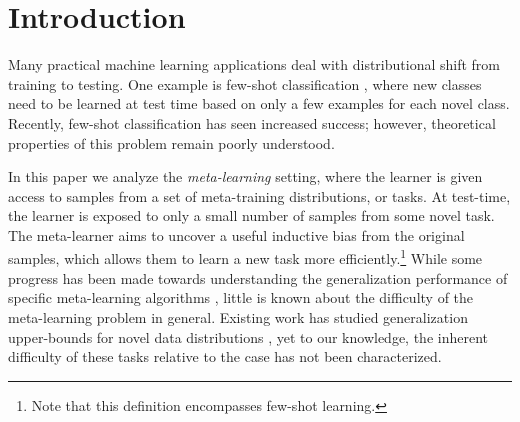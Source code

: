\section{Introduction}
Many practical machine learning applications deal with distributional shift from training to testing. One example is few-shot classification
\citep{ravi2016optimization, vinyals2016matching}, where new classes need to be learned at test time based on only a few examples for each novel class. Recently, few-shot classification has seen increased success; however, 
theoretical properties of this
problem remain poorly understood. 


In this paper we analyze the {\it meta-learning} setting, where 
the learner is given access to samples from a set of meta-training distributions, or tasks.  At test-time, the learner is exposed to only a small number of samples from some novel task. The meta-learner aims to uncover a useful inductive bias from the original samples, which allows them to learn a new task more efficiently.\footnote{Note that this definition encompasses few-shot learning.}
While some progress has been made towards understanding the generalization performance of specific meta-learning algorithms \citep{amit2017meta, khodak2019provable, pmlr-v98-bullins19a, pmlr-v97-denevi19a, cao2019theoretical}, little is known about the difficulty of the meta-learning problem in general.
Existing work has studied generalization upper-bounds for novel data distributions \citep{ben2010theory, amit2017meta}, yet to our knowledge, the inherent difficulty of these tasks relative to the \iid case has not been characterized. 

